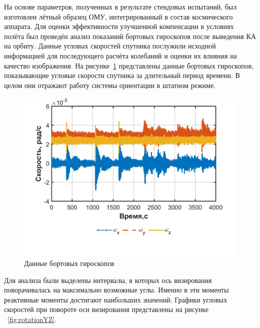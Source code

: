  На основе параметров, полученных в результате стендовых испытаний, был изготовлен лётный образец ОМУ, интегрированный в состав космического аппарата. Для оценки эффективности улучшенной компенсации в условиях полёта был проведён анализ показаний бортовых гироскопов после выведения КА на орбиту. Данные угловых скоростей спутника послужили исходной информацией для последующего расчёта колебаний и оценки их влияния на качество изображения. На рисунке~\cref{fig:sat_gyro_data} представлены данные бортовых гироскопов, показывающие угловые скорости спутника за длительный период времени. В целом они отражают работу системы ориентации в штатном режиме.
 
 \begin{figure}[h!]
 	\centering
 	\includegraphics[width=0.8\linewidth]{matlab/img/sat_gyro_data.png}
 	\caption{Данные бортовых гироскопов}
 	\label{fig:sat_gyro_data}
 \end{figure}
 
 Для анализа были выделены интервалы, в которых ось визирования поворачивалась на максимально возможные углы. Именно в эти моменты реактивные моменты достигают наибольших значений. Графики угловых скоростей при повороте оси визирования представлены на рисунке ~\cref{fig:rotationYZ}.
 

